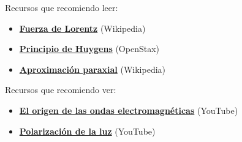 \documentclass{book}
\begin{document}
  \noindent Recursos que recomiendo leer:
  \begin{itemize}
    \item \href{https://es.wikipedia.org/wiki/Fuerza_de_Lorentz}{\textbf{Fuerza de Lorentz}} (Wikipedia)
    \item \href{https://openstax.org/books/f%C3%ADsica-universitaria-volumen-3/pages/1-6-principio-de-huygens}{\textbf{Principio de Huygens}} (OpenStax)
    \item \href{https://es.wikipedia.org/wiki/Aproximaci%C3%B3n_paraxial}{\textbf{Aproximación paraxial}} (Wikipedia)
  \end{itemize}
  \vspace{5pt}

  \noindent Recursos que recomiendo ver:
  \begin{itemize}
    \item \href{https://www.youtube.com/watch?v=cKKM9boWqZs}{\textbf{El origen de las ondas electromagnéticas}} (YouTube)
    \item \href{https://www.youtube.com/watch?v=PMjADwpLlfs}{\textbf{Polarización de la luz}} (YouTube)
  \end{itemize}

  

  \printbibliography
\end{document}
